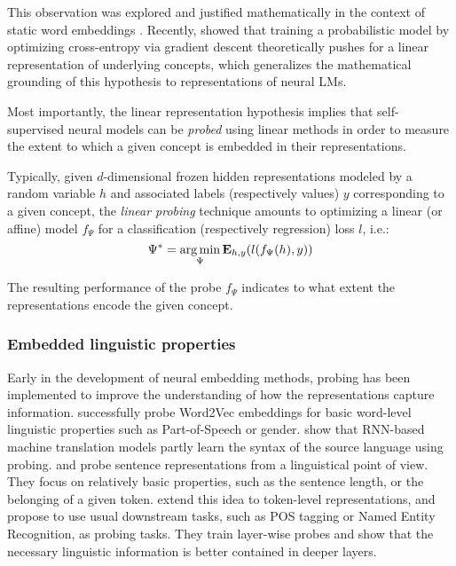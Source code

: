 This observation was explored and justified mathematically in the context of static word embeddings \citep{ethayarajh-etal-2019-towards, pmlr-v97-allen19a}. Recently, \citet{jiang2024on} showed that training a probabilistic model by optimizing cross-entropy via gradient descent theoretically pushes for a linear representation of underlying concepts, which generalizes the mathematical grounding of this hypothesis to representations of neural LMs. 

Most importantly, the linear representation hypothesis implies that self-supervised neural models can be \textit{probed} using linear methods in order to measure the extent to which a given concept is embedded in their representations. 

Typically, given $d$-dimensional frozen hidden representations modeled by a random variable $h$ and associated labels (respectively values) $y$ corresponding to a given concept, the \textit{linear probing} technique amounts to optimizing a linear (or affine) model $f_\Psi$ for a classification (respectively regression) loss $l$, i.e.:
$$
\Psi^* = \operatorname*{arg\,min}_{\Psi} \mathbf{E}_{h, y}(l(f_\Psi(h), y))
$$

The resulting performance of the probe $f_\Psi$ indicates to what extent the representations encode the given concept.

\subsubsection{Embedded linguistic properties}

Early in the development of neural embedding methods, probing has been implemented to improve the understanding of how the representations capture information. \citet{kohn-2015-whats} successfully probe Word2Vec embeddings for basic word-level linguistic properties such as Part-of-Speech or gender. \citet{shi-etal-2016-string} show that RNN-based machine translation models partly learn the syntax of the source language using probing. \citet{adi2017finegrained} and \citet{conneau-etal-2018-cram} probe sentence representations from a linguistical point of view. They focus on relatively basic properties, such as the sentence length, or the belonging of a given token. \citet{liu-etal-2019-linguistic} extend this idea to token-level representations, and propose to use usual downstream tasks, such as POS tagging or Named Entity Recognition, as probing tasks. They train layer-wise probes and show that the necessary linguistic information is better contained in deeper layers.

